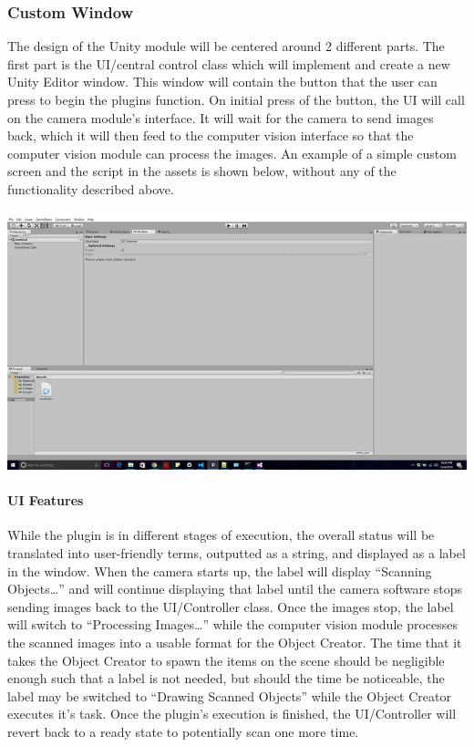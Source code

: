 \documentclass[12pt]{article}
\let\origfigure=\figure
\let\endorigfigure=\endfigure
\renewenvironment{figure}[1][]{%
  \origfigure[H]
}{%
  \endorigfigure
}
\begin{document}
\subsubsection{Custom Window}\label{custom-window}

The design of the Unity module will be centered around 2 different
parts. The first part is the UI/central control class which will
implement and create a new Unity Editor window. This window will contain
the button that the user can press to begin the plugins function. On
initial press of the button, the UI will call on the camera module's
interface. It will wait for the camera to send images back, which it
will then feed to the computer vision interface so that the computer
vision module can process the images. An example of a simple custom
screen and the script in the assets is shown below, without any of the
functionality described above.

\begin{figure}
\centering
\includegraphics{Pictures/editorwindow.png}
\caption{Unity Test Custom Window}
\end{figure}

\paragraph{UI Features}\label{ui-features}

While the plugin is in different stages of execution, the overall status
will be translated into user-friendly terms, outputted as a string, and
displayed as a label in the window. When the camera starts up, the label
will display ``Scanning Objects\ldots{}'' and will continue displaying
that label until the camera software stops sending images back to the
UI/Controller class. Once the images stop, the label will switch to
``Processing Images\ldots{}'' while the computer vision module processes
the scanned images into a usable format for the Object Creator. The time
that it takes the Object Creator to spawn the items on the scene should
be negligible enough such that a label is not needed, but should the
time be noticeable, the label may be switched to ``Drawing Scanned
Objects'' while the Object Creator executes it's task. Once the plugin's
execution is finished, the UI/Controller will revert back to a ready
state to potentially scan one more time.
\end{document}
